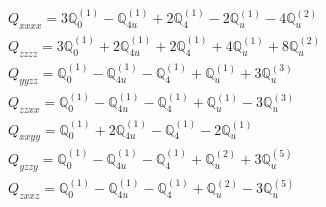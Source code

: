 \documentclass[fleqn,8pt,landscape]{jsarticle}
\begin{document}
\begin{align*}
& Q_{xxxx} = 3 \mathbb{Q}_{0}^{(1)} - \mathbb{Q}_{4u}^{(1)} + 2 \mathbb{Q}_{4}^{(1)} - 2 \mathbb{Q}_{u}^{(1)} - 4 \mathbb{Q}_{u}^{(2)} \\
& Q_{zzzz} = 3 \mathbb{Q}_{0}^{(1)} + 2 \mathbb{Q}_{4u}^{(1)} + 2 \mathbb{Q}_{4}^{(1)} + 4 \mathbb{Q}_{u}^{(1)} + 8 \mathbb{Q}_{u}^{(2)} \\
& Q_{yyzz} = \mathbb{Q}_{0}^{(1)} - \mathbb{Q}_{4u}^{(1)} - \mathbb{Q}_{4}^{(1)} + \mathbb{Q}_{u}^{(1)} + 3 \mathbb{Q}_{u}^{(3)} \\
& Q_{zzxx} = \mathbb{Q}_{0}^{(1)} - \mathbb{Q}_{4u}^{(1)} - \mathbb{Q}_{4}^{(1)} + \mathbb{Q}_{u}^{(1)} - 3 \mathbb{Q}_{u}^{(3)} \\
& Q_{xxyy} = \mathbb{Q}_{0}^{(1)} + 2 \mathbb{Q}_{4u}^{(1)} - \mathbb{Q}_{4}^{(1)} - 2 \mathbb{Q}_{u}^{(1)} \\
& Q_{yzzy} = \mathbb{Q}_{0}^{(1)} - \mathbb{Q}_{4u}^{(1)} - \mathbb{Q}_{4}^{(1)} + \mathbb{Q}_{u}^{(2)} + 3 \mathbb{Q}_{u}^{(5)} \\
& Q_{zxxz} = \mathbb{Q}_{0}^{(1)} - \mathbb{Q}_{4u}^{(1)} - \mathbb{Q}_{4}^{(1)} + \mathbb{Q}_{u}^{(2)} - 3 \mathbb{Q}_{u}^{(5)}
\end{align*}
\end{document}
